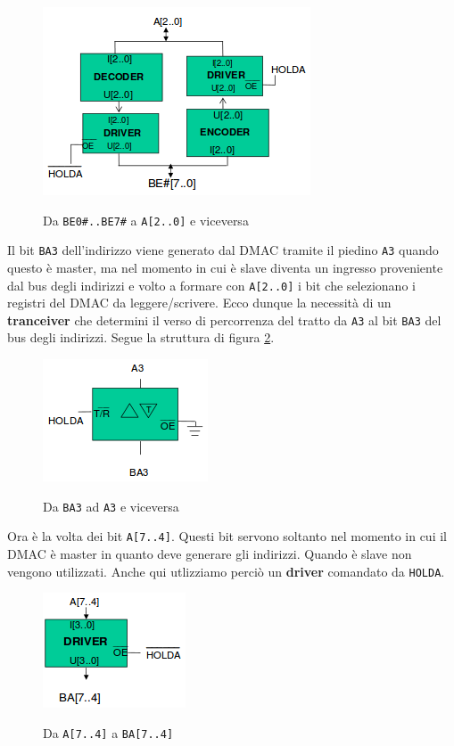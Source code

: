 \documentclass[11pt]{book}
\begin{document}
\begin{figure}[h]
  \centering
  \includegraphics[width=.4\textwidth]{images/latchdestra.png}
  \label{latchdestra}
  \caption{Da \texttt{BE0\#..BE7\#} a \texttt{A[2..0]} e viceversa}
\end{figure}

Il bit \texttt{BA3} dell'indirizzo viene generato dal DMAC tramite il
piedino \texttt{A3} quando questo \`e master, ma nel momento in cui
\`e slave diventa un ingresso proveniente dal bus degli indirizzi e
volto a formare con \texttt{A[2..0]} i bit che selezionano i registri
del DMAC da leggere/scrivere. Ecco dunque la necessit\`a di un
\textbf{tranceiver} che determini il verso di percorrenza del tratto
da \texttt{A3} al bit \texttt{BA3} del bus degli indirizzi. Segue la
struttura di figura \ref{a3ba3}.

\begin{figure}[h]
  \centering
  \includegraphics[width=.25\textwidth]{images/a3ba3.png}
  \label{a3ba3}
  \caption{Da \texttt{BA3} ad \texttt{A3} e viceversa}
\end{figure}

Ora \`e la volta dei bit \texttt{A[7..4]}. Questi bit servono soltanto
nel momento in cui il DMAC \`e master in quanto deve generare gli
indirizzi. Quando \`e slave non vengono utilizzati. Anche qui
utlizziamo perci\`o un \textbf{driver} comandato da \texttt{HOLDA}.

\begin{figure}[h]
  \centering
  \includegraphics[width=.25\textwidth]{images/a74.png}
  \label{a74}
  \caption{Da \texttt{A[7..4]} a \texttt{BA[7..4]}}
\end{figure}
\end{document}
